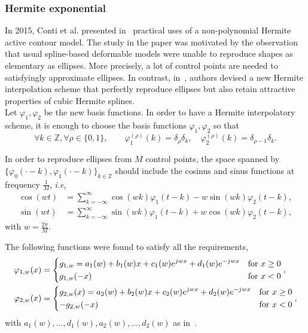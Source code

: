 \subsubsection{Hermite exponential}

In 2015, Conti et al\@. presented in~\cite{conti_ellipse-preserving_2015} practical uses of a non-polynomial Hermite 
active contour model. The study in the paper was motivated by the observation that usual spline-based deformable models  
were unable to reproduce shapes as elementary as ellipses. More precisely, a lot of control points are needed to 
satisfyingly approximate ellipses. In contrast, in~\cite{conti_ellipse-preserving_2015}, authors devised a new Hermite 
interpolation scheme that perfectly reproduce ellipses but also retain attractive properties of cubic Hermite splines.  
\\

Let $\varphi_1, \varphi_2$ be the new basis functions. In order to have a Hermite interpolatory scheme, it is enough to 
choose the basis functions $\varphi_1, \varphi_2$ so that
\begin{equation*}
  \forall k \in \mathbb{Z}, \forall \rho \in \{0,1\}, \qquad \varphi_1^{(\rho)}(k) = \delta_{\rho}\delta_k, \quad 
  \varphi_2^{(\rho)}(k) = \delta_{\rho-1}\delta_k.
\end{equation*}

In order to reproduce ellipses from $M$ control points, the space spanned by ${\{\varphi_0(\cdot-k), 
\varphi_1(\cdot-k)\}_{k \in \mathbb{Z}}}$ should include the cosinus and sinus functions at frequency $\frac{1}{M}$, 
\textit{i.e},
\begin{align*}
  \cos (wt) &= \sum_{k=-\infty}^{\infty} \cos (wk) \varphi_1(t-k) - w \sin (wk) \varphi_2(t-k), \\
  \sin (wt) &= \sum_{k=-\infty}^{\infty} \sin (wk) \varphi_1(t-k) + w \cos (wk) \varphi_2(t-k),
\end{align*}
with $w = \frac{2\pi}{M}$.

The following functions were found to satisfy all the requirements,
\begin{align*}
  \varphi_{1, w}(x) &=
  \begin{dcases}
    g_{1,w} = a_1(w) + b_1(w)x + c_1(w) e^{jwx} + d_1(w)e^{-jwx} &\text{for } x \geq 0 \\
    g_{1, w}(-x) &\text{for } x < 0\\
  \end{dcases}, \\
  \varphi_{2, w}(x) &=
  \begin{dcases}
    g_{2, w}(x) =  a_2(w) + b_2(w)x + c_2(w) e^{jwx} + d_2(w)e^{-jwx} &\text{for } x \geq 0 \\
    -g_{2, w}(-x) &\text{for } x < 0\\
  \end{dcases},
\end{align*}
with $a_1(w), \ldots, d_1(w), a_2(w), \ldots, d_2(w)$ as in~\cite[(2), (3), (4)]{conti_ellipse-preserving_2015}.

